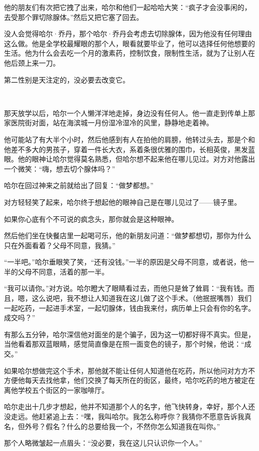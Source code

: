 \documentclass[../main]{subfiles}
\begin{document}
他的朋友们有次把它拽了出来，哈尔和他们一起哈哈大笑：“疯子才会没事闲的，去受那个罪切除腺体。”然后又把它塞了回去。

没人会觉得哈尔·乔丹，那个哈尔·乔丹会考虑去切除腺体，因为他没有任何理由这么做。他是全学校最耀眼的那个人，眼看就要毕业了，他可以选择任何他想要的生活。他为什么会去吃一个月的激素药，控制饮食，限制性生活，就为了让别人在他后颈上来一刀。

第二性别是天注定的，没必要去改变它。

~\

那天放学以后，哈尔一个人懒洋洋地走掉，身边没有任何人。他一直走到传单上那家医院街对面，站在海滨城一月份湿冷湿冷的风里，静静地走着神。

他可能站了有大半个小时，然后他感到有人在拍他的肩膀，他转过头去，那是个和他差不多大的男孩子，穿着一件长大衣，系着条很优雅的围巾，长相英俊，黑发蓝眼。他的眼神让哈尔觉得莫名熟悉，但哈尔想不起来他在哪儿见过。对方对他露出一个微笑：“嗨，想去切个腺体吗？”

哈尔在回过神来之前就给出了回复：“做梦都想。”

对方轻轻笑了起来，哈尔终于想起他的眼神自己是在哪儿见过了——镜子里。

如果你心底有个不可说的疯念头，那你就会是这种眼神。

然后他们坐在快餐店里一起喝可乐，他的新朋友问道：“做梦都想切，那你为什么只在外面看着？父母不同意，我猜。”

“一半吧。”哈尔垂眼笑了笑，“还有没钱。”一半的原因是父母不同意，或者说，他一半的父母不同意，活着的那一半。

“我可以请你。”对方说。哈尔瞪大了眼睛看过去，而他只是耸了耸肩：“我有钱。而且，嗯，这么说吧，我不想让人知道我在这儿做了这个手术。（他抿抿嘴唇）我们一起吃药，一起进手术室，一起切腺体，钱由我来付，病历单上只会有你的名字。成交吗？”

有那么五分钟，哈尔深信他对面坐的是个骗子，因为这一切都好得不真实。但是，当他看着那双蓝眼睛，感觉简直像是在照一面变色的镜子，那个时候，他说：“成交。”

如果哈尔想做完这个手术，那他就不能让任何人知道他在吃药，所以他问对方方不方便他每天去找他拿，他们交换了每天所在的街区，最终，哈尔吃药的地方被定在离他学校五个街区的一家咖啡厅。

哈尔走出十几步才想起，他并不知道那个人的名字，他飞快转身，幸好，那个人还没走远。他赶紧追上去：“嘿，我叫哈尔。我怎么称呼你？我猜你不愿意告诉我真名，但外号？假名？什么的总要给我一个，不然你怎么知道我在叫你。”

那个人略微皱起一点眉头：“没必要，我在这儿只认识你一个人。”
\end{document}
